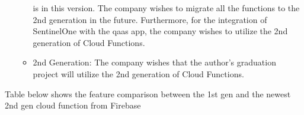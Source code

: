 \begin{itemize}
\begin{itemize}
                        is in this version. The company wishes to migrate all the functions to the 2nd generation in
                        the future. Furthermore, for the integration of SentinelOne with the \acrshort{qaas} app, the
                        company wishes to utilize the 2nd generation of Cloud Functions.
                  \item 2nd Generation: The company wishes that the author's graduation project will utilize the 2nd
                        generation of Cloud Functions.
            \end{itemize}
\end{itemize}

Table below shows the feature comparison between the 1st gen and the newest 2nd gen cloud function from Firebase

